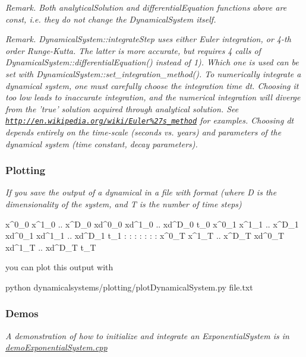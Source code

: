 {\itshape {\itshape Remark}. Both analytical\+Solution and differential\+Equation functions above are const, i.\+e. they do not change the Dynamical\+System itself.}

{\itshape {\itshape Remark}. Dynamical\+System\+::integrate\+Step uses either Euler integration, or 4-\/th order Runge-\/\+Kutta. The latter is more accurate, but requires 4 calls of Dynamical\+System\+::differential\+Equation() instead of 1). Which one is used can be set with Dynamical\+System\+::set\+\_\+integration\+\_\+method(). To numerically integrate a dynamical system, one must carefully choose the integration time dt. Choosing it too low leads to inaccurate integration, and the numerical integration will diverge from the 'true' solution acquired through analytical solution. See \href{http://en.wikipedia.org/wiki/Euler%27s_method}{\tt http\+://en.\+wikipedia.\+org/wiki/\+Euler\%27s\+\_\+method} for examples. Choosing dt depends entirely on the time-\/scale (seconds vs. years) and parameters of the dynamical system (time constant, decay parameters).}

{\itshape }\hypertarget{page_dyn_sys_dynsys_implementation1_plotting}{}\subsubsection{Plotting}\label{page_dyn_sys_dynsys_implementation1_plotting}
{\itshape  If you save the output of a dynamical in a file with format (where D is the dimensionality of the system, and T is the number of time steps) \begin{DoxyVerb}x^0_0 x^1_0 .. x^D_0   xd^0_0 xd^1_0 .. xd^D_0   t_0   
x^0_1 x^1_1 .. x^D_1   xd^0_1 xd^1_1 .. xd^D_1   t_1   
   :     :       :         :      :       :       :    
x^0_T x^1_T .. x^D_T   xd^0_T xd^1_T .. xd^D_T   t_T   
\end{DoxyVerb}
 you can plot this output with 
\begin{DoxyCode}
python dynamicalsystems/plotting/plotDynamicalSystem.py file.txt
\end{DoxyCode}
}

{\itshape }\hypertarget{page_dyn_sys_dynsys_implementation1_demo}{}\subsubsection{Demos}\label{page_dyn_sys_dynsys_implementation1_demo}
{\itshape  A demonstration of how to initialize and integrate an Exponential\+System is in \hyperlink{demoExponentialSystem_8cpp}{demo\+Exponential\+System.\+cpp}}

